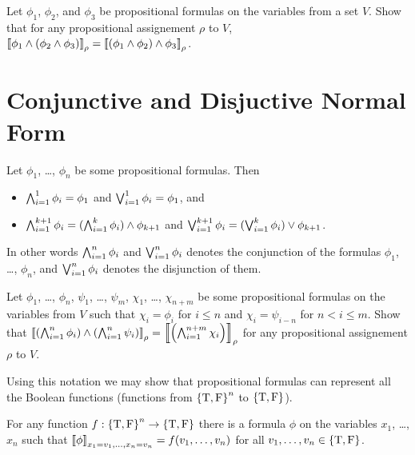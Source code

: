 \begin{exercise}
  Let $\phi_1$, $\phi_2$, and $\phi_3$ be propositional formulas on the
  variables from a set $V$. Show that for any propositional assignement
  $\rho$ to $V$,
  $\left\llbracket {\phi_1 \land (\phi_2 \land \phi_3)} \right\rrbracket_{\rho} =
   \left\llbracket {(\phi_1 \land \phi_2) \land \phi_3} \right\rrbracket_{\rho}$.
\end{exercise}

\section{Conjunctive and Disjuctive Normal Form}

Let $\phi_1$, \dots, $\phi_n$ be some propositional formulas. Then
\begin{itemize}
  \item $\bigwedge_{i = 1}^1 \phi_i = \phi_1$ and
    $\bigvee_{i = 1}^1 \phi_i = \phi_1$, and
  \item $\bigwedge_{i = 1}^{k + 1} \phi_i =
    (\bigwedge_{i = 1}^{k} \phi_i) \land \phi_{k + 1}$ and
    $\bigvee_{i = 1}^{k + 1} \phi_i =
      (\bigvee_{i = 1}^{k} \phi_i) \lor \phi_{k + 1}$.
\end{itemize}
In other words $\bigwedge_{i = 1}^n \phi_i$ and $\bigvee_{i = 1}^n \phi_i$
denotes the conjunction of the formulas $\phi_1$, \dots, $\phi_n$, and
$\bigvee_{i = 1}^n \phi_i$ denotes the disjunction of them.

\begin{exercise}
  Let $\phi_1$, \dots, $\phi_n$, $\psi_1$, \dots, $\psi_m$, $\chi_1$, \dots,
  $\chi_{n + m}$ be some propositional formulas on the variables from $V$
  such that $\chi_i = \phi_i$ for $i \le n$ and $\chi_i = \psi_{i - n}$ for
  $n < i \le m$. Show that
  $\left\llbracket {\left(\bigwedge_{i = 1}^n \phi_i\right) \land
    \left(\bigwedge_{i = 1}^n \psi_i\right)} \right\rrbracket_{\rho} =
  \left\llbracket {\left(\bigwedge_{i = 1}^{n + m} \chi_i\right)} \right\rrbracket_{\rho}$
  for any propositional assignement $\rho$ to $V$.
\end{exercise}


Using this notation we may show that propositional formulas can represent all
the Boolean functions (functions from $\set{\ltrue, \lfalse}^n$ to
$\set{\ltrue, \lfalse}$).
\begin{theorem}
\label{theorem:function-to-formula}
  For any function $f : \set{\ltrue, \lfalse}^n \to
  \set{\ltrue, \lfalse}$ there is a
  formula $\phi$ on the variables $x_1$, \dots, $x_n$ such that
  $\left\llbracket {\phi} \right\rrbracket_{x_1 = v_1, \dots, x_n = v_n} = f(v_1, \dots, v_n)$ for all
  $v_1, \dots, v_n \in \set{\ltrue, \lfalse}$.
\end{theorem}

